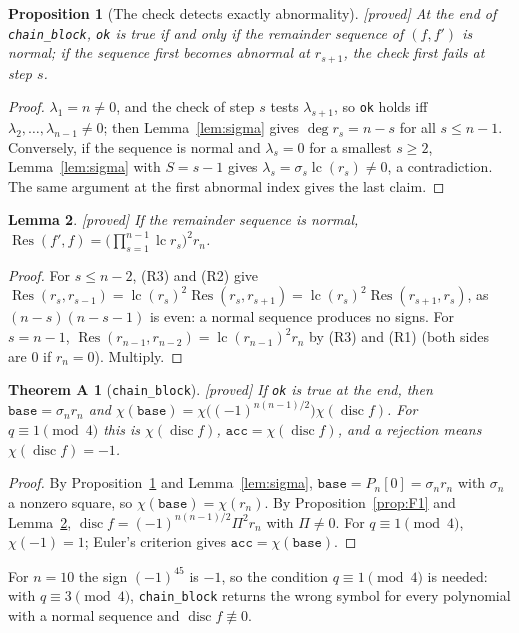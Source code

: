\documentclass[10pt,a4paper]{article}
\DeclareMathOperator{\Res}{Res}
\DeclareMathOperator{\disc}{disc}
\DeclareMathOperator{\lc}{lc}
\newcommand{\code}[1]{\texttt{#1}}
\newcommand{\stproved}{\textsf{\small[proved]}\xspace}
\theoremstyle{plain}
\newtheorem{proposition}{Proposition}
\newtheorem{lemma}[proposition]{Lemma}
\newtheorem*{thmA}{Theorem A}
\theoremstyle{definition}
\begin{document}
\begin{proposition}[The check detects exactly abnormality]\label{prop:okiffnormal}\stproved
At the end of \code{chain\_block}, \code{ok} is true if and only if the remainder sequence of $(f,f')$ is normal; if the sequence first becomes abnormal at
$r_{s+1}$, the check first fails at step $s$.
\end{proposition}
\begin{proof}
$\lambda_1=n\neq0$, and the check of step $s$ tests $\lambda_{s+1}$, so \code{ok} holds iff $\lambda_2,\dots,\lambda_{n-1}\neq0$; then Lemma~\ref{lem:sigma} gives
$\deg r_s=n-s$ for all $s\le n-1$.  Conversely, if the sequence is normal and $\lambda_s=0$ for a smallest $s\ge2$, Lemma~\ref{lem:sigma} with $S=s-1$ gives
$\lambda_s=\sigma_s\lc(r_s)\neq0$, a contradiction.  The same argument at the first abnormal index gives the last claim.
\end{proof}

\begin{lemma}\label{lem:resnormal}\stproved
If the remainder sequence is normal, $\Res(f',f)=\bigl(\prod_{s=1}^{n-1}\lc r_s\bigr)^2r_n$.
\end{lemma}
\begin{proof}
For $s\le n-2$, (R3) and (R2) give $\Res(r_s,r_{s-1})=\lc(r_s)^2\Res(r_s,r_{s+1})=\lc(r_s)^2\Res(r_{s+1},r_s)$, as $(n-s)(n-s-1)$ is even: a normal sequence
produces no signs.  For $s=n-1$, $\Res(r_{n-1},r_{n-2})=\lc(r_{n-1})^2r_n$ by (R3) and (R1) (both sides are $0$ if $r_n=0$).  Multiply.
\end{proof}

\begin{thmA}[\code{chain\_block}]\stproved
If \code{ok} is true at the end, then $\code{base}=\sigma_nr_n$ and $\chi(\code{base})=\chi\bigl((-1)^{n(n-1)/2}\bigr)\chi(\disc f)$.  For $q\equiv1\pmod4$
this is $\chi(\disc f)$, $\code{acc}=\chi(\disc f)$, and a rejection means $\chi(\disc f)=-1$.
\end{thmA}
\begin{proof}
By Proposition~\ref{prop:okiffnormal} and Lemma~\ref{lem:sigma}, $\code{base}=P_n[0]=\sigma_nr_n$ with $\sigma_n$ a nonzero square, so $\chi(\code{base})=\chi(r_n)$.  By
Proposition~\ref{prop:F1} and Lemma~\ref{lem:resnormal}, $\disc f=(-1)^{n(n-1)/2}\Pi^2r_n$ with $\Pi\neq0$.  For $q\equiv1\pmod4$, $\chi(-1)=1$; Euler's criterion gives
$\code{acc}=\chi(\code{base})$.
\end{proof}

For $n=10$ the sign $(-1)^{45}$ is $-1$, so the condition $q\equiv1\pmod4$ is needed: with $q\equiv3\pmod4$, \code{chain\_block} returns the wrong symbol for every
polynomial with a normal sequence and $\disc f\not\equiv0$.
\end{document}
